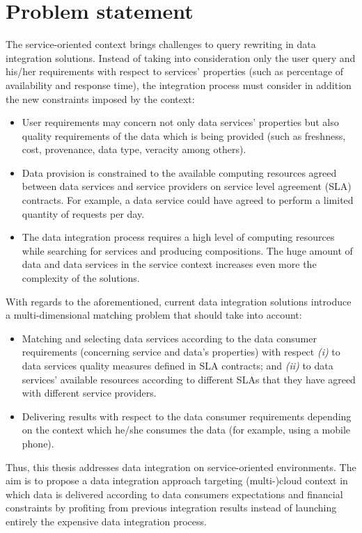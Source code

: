 \section{Problem statement}\label{problem}
%
The service-oriented context brings challenges to query rewriting in data integration solutions.
%
Instead of taking into consideration only the user query and his/her requirements with respect to services' properties (such as percentage of availability and response time), the integration process must consider in addition the new constraints imposed by the context: 
%
\begin{itemize}
\renewcommand{\labelitemi}{$-$}
\item User requirements may concern not only data services' properties but also quality requirements of the data which is being provided (such as freshness, cost, provenance, data type, veracity among others).
%
\item Data provision is constrained to the available computing resources agreed between data services and service providers on service level agreement (SLA) contracts. For example, a data service could have agreed to perform a limited quantity of requests per day.
%
\item The data integration process requires a high level of computing resources while searching for services and producing compositions.
The huge amount of data and data services in the service context increases even 
more the complexity of the solutions.
\end{itemize}
%
With regards to the aforementioned, current data integration solutions introduce a multi-dimensional matching problem that should take into account:
%
\begin{itemize}
\renewcommand{\labelitemi}{$-$}
%
\item Matching and selecting data services according to the data consumer requirements (concerning service and data's properties) with respect \textit{(i)} to data 
services quality measures defined in SLA contracts; and \textit{(ii)} to data services' available resources according to different SLAs that they have agreed with different service providers.
%
%
\item Delivering results with respect to the data consumer requirements depending on the context which he/she consumes the data (for example, using a mobile phone).
\end{itemize}
%
Thus, this thesis addresses data integration on service-oriented environments.
%
The aim is to propose a data integration approach targeting (multi-)cloud context in 
which data is delivered according to data consumers expectations and financial constraints by profiting from 
previous integration results instead of launching entirely the expensive data integration 
process. 



